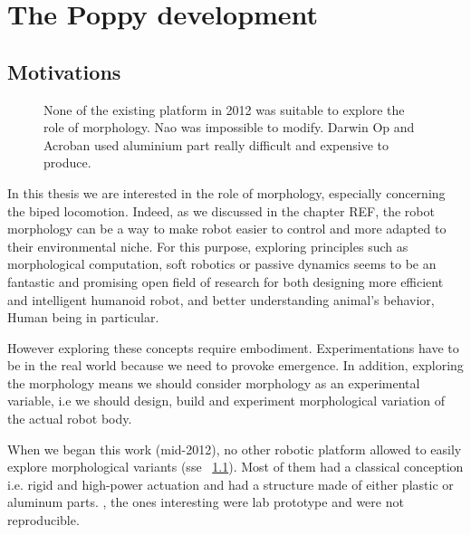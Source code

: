 

% 
% 

\chapter{The Poppy development} %

\section{Motivations} %

\begin{figure}[!b]
\centering
    \hfil
    \hfil
    \caption{None of the existing platform in 2012 was suitable to explore the role of morphology. Nao was impossible to modify. Darwin Op and Acroban used aluminium part really difficult and expensive to produce.}
    \label{fig:2012_Humanoids}
\end{figure}

In this thesis we are interested in the role of morphology, especially concerning the biped locomotion. Indeed, as we discussed in the chapter REF, the robot morphology can be a way to make robot easier to control and more adapted to their environmental niche. For this purpose, exploring principles such as morphological computation, soft robotics or passive dynamics seems to be an fantastic and promising open field of research for both designing more efficient and intelligent humanoid robot, and better understanding animal's behavior, Human being in particular.

However exploring these concepts require embodiment. Experimentations have to be in the real world because we need to provoke emergence. In addition, exploring the morphology means we should consider morphology as an experimental variable, i.e we should design, build and experiment morphological variation of the actual robot body.

When we began this work (mid-2012), no other robotic platform allowed to easily explore morphological variants (sse \figurename~\ref{fig:2012_Humanoids}). Most of them had a classical conception i.e. rigid and high-power actuation and had a structure made of either plastic or aluminum parts.  , the ones interesting were lab prototype and were not reproducible.

